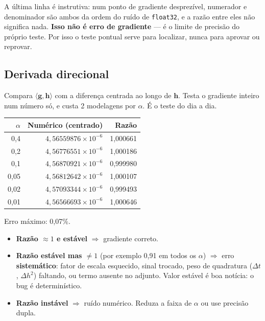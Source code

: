 \documentclass[11pt,a4paper,oneside]{report}
\begin{document}
A última linha é instrutiva: num ponto de gradiente desprezível, numerador e
denominador são ambos da ordem do ruído de \texttt{float32}, e a razão entre
eles não significa nada. \textbf{Isso não é erro de gradiente} --- é o limite
de precisão do próprio teste. Por isso o teste pontual serve para localizar,
nunca para aprovar ou reprovar.

\subsection{Derivada direcional}

Compara $\langle \mathbf{g}, \mathbf{h}\rangle$ com a diferença centrada ao
longo de $\mathbf{h}$. Testa o gradiente inteiro num número só, e custa 2
modelagens por $\alpha$. É o teste do dia a dia.

\begin{center}
\begin{tabular}{@{}rrr@{}}
\toprule
$\alpha$ & \textbf{Numérico (centrado)} & \textbf{Razão} \\
\midrule
0{,}4  & $4{,}56559876\times10^{-6}$ & 1{,}000661 \\
0{,}2  & $4{,}56776551\times10^{-6}$ & 1{,}000186 \\
0{,}1  & $4{,}56870921\times10^{-6}$ & 0{,}999980 \\
0{,}05 & $4{,}56812642\times10^{-6}$ & 1{,}000107 \\
0{,}02 & $4{,}57093344\times10^{-6}$ & 0{,}999493 \\
0{,}01 & $4{,}56566693\times10^{-6}$ & 1{,}000646 \\
\bottomrule
\end{tabular}
\end{center}
{\small Erro máximo: 0{,}07\%.}

\begin{pratica}
\begin{itemize}[leftmargin=*]
\item \textbf{Razão $\approx 1$ e estável} $\Rightarrow$ gradiente correto.
\item \textbf{Razão estável mas $\ne 1$} (por exemplo 0{,}91 em todos os
$\alpha$) $\Rightarrow$ erro \textbf{sistemático}: fator de escala esquecido,
sinal trocado, peso de quadratura ($\Delta t$, $\Delta h^2$) faltando, ou
termo ausente no adjunto. Valor estável é boa notícia: o bug é determinístico.
\item \textbf{Razão instável} $\Rightarrow$ ruído numérico. Reduza a faixa de
$\alpha$ ou use precisão dupla.
\end{itemize}
\end{pratica}
\end{document}
